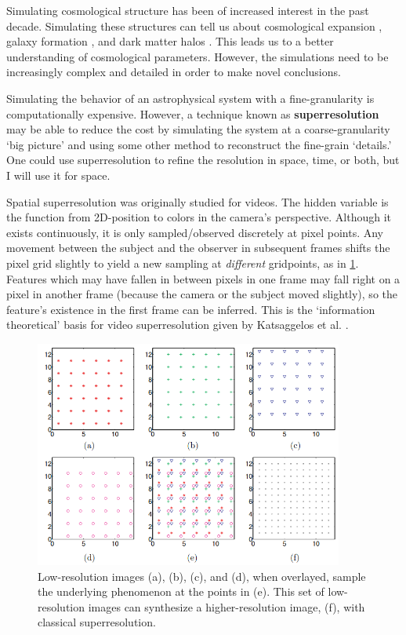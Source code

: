 Simulating cosmological structure has been of increased interest in the past decade. Simulating these structures can tell us about cosmological expansion \cite{cosmological-expansion-application}, galaxy formation \cite{galaxy-formation-application}, and dark matter halos \cite{dark-matter-application}. This leads us to a better understanding of cosmological parameters. However, the simulations need to be increasingly complex and detailed in order to make novel conclusions.

Simulating the behavior of an astrophysical system with a fine-granularity is computationally expensive. However, a technique known as \textbf{superresolution} may be able to reduce the cost by simulating the system at a coarse-granularity `big picture' and using some other method to reconstruct the fine-grain `details.' One could use superresolution to refine the resolution in space, time, or both, but I will use it for space.

Spatial superresolution was originally studied for videos. The hidden variable is the function from 2D-position to colors in the camera's perspective. Although it exists continuously, it is only sampled/observed discretely at pixel points.
Any movement between the subject and the observer in subsequent frames shifts the pixel grid slightly to yield a new sampling at \textit{different} gridpoints, as in \cref{classical-superresolution}.
Features which may have fallen in between pixels in one frame may fall right on a pixel in another frame (because the camera or the subject moved slightly), so the feature's existence in the first frame can be inferred.
This is the `information theoretical' basis for video superresolution given by Katsaggelos et al. \cite{synthesis-lecture}.

\begin{figure}[h!]
  \includegraphics[width=4in]{classical-superresolution.png}
  \caption{Low-resolution images (a), (b), (c), and (d), when overlayed, sample the underlying phenomenon at the points in (e). This set of low-resolution images can synthesize a higher-resolution image, (f), with classical superresolution.}
  \label{classical-superresolution}
\end{figure}

